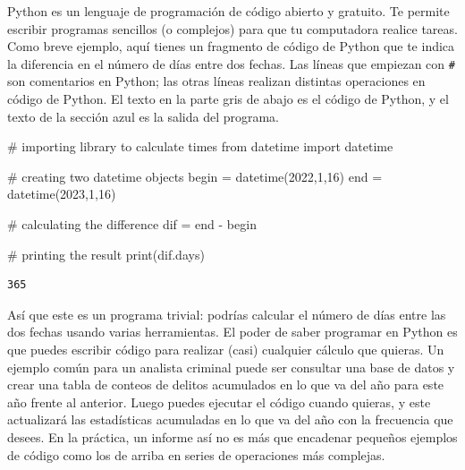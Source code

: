 \documentclass[
  letterpaper,
]{scrbook}
\newenvironment{Shaded}{\begin{snugshade}}{\end{snugshade}}
\newcommand{\BuiltInTok}[1]{\textcolor[rgb]{0.00,0.23,0.31}{#1}}
\newcommand{\CommentTok}[1]{\textcolor[rgb]{0.37,0.37,0.37}{#1}}
\newcommand{\DecValTok}[1]{\textcolor[rgb]{0.68,0.00,0.00}{#1}}
\newcommand{\ImportTok}[1]{\textcolor[rgb]{0.00,0.46,0.62}{#1}}
\newcommand{\NormalTok}[1]{\textcolor[rgb]{0.00,0.23,0.31}{#1}}
\newcommand{\OperatorTok}[1]{\textcolor[rgb]{0.37,0.37,0.37}{#1}}
\begin{document}

Python es un lenguaje de programación de código abierto y gratuito. Te
permite escribir programas sencillos (o complejos) para que tu
computadora realice tareas. Como breve ejemplo, aquí tienes un fragmento
de código de Python que te indica la diferencia en el número de días
entre dos fechas. Las líneas que empiezan con \texttt{\#} son
comentarios en Python; las otras líneas realizan distintas operaciones
en código de Python. El texto en la parte gris de abajo es el código de
Python, y el texto de la sección azul es la salida del programa.

\begin{Shaded}
\begin{Highlighting}[]
\CommentTok{\# importing library to calculate times}
\ImportTok{from}\NormalTok{ datetime }\ImportTok{import}\NormalTok{ datetime}

\CommentTok{\# creating two datetime objects}
\NormalTok{begin }\OperatorTok{=}\NormalTok{ datetime(}\DecValTok{2022}\NormalTok{,}\DecValTok{1}\NormalTok{,}\DecValTok{16}\NormalTok{)}
\NormalTok{end }\OperatorTok{=}\NormalTok{ datetime(}\DecValTok{2023}\NormalTok{,}\DecValTok{1}\NormalTok{,}\DecValTok{16}\NormalTok{)}

\CommentTok{\# calculating the difference}
\NormalTok{dif }\OperatorTok{=}\NormalTok{ end }\OperatorTok{{-}}\NormalTok{ begin}

\CommentTok{\# printing the result}
\BuiltInTok{print}\NormalTok{(dif.days)}
\end{Highlighting}
\end{Shaded}

\begin{verbatim}
365
\end{verbatim}

Así que este es un programa trivial: podrías calcular el número de días
entre las dos fechas usando varias herramientas. El poder de saber
programar en Python es que puedes escribir código para realizar (casi)
cualquier cálculo que quieras. Un ejemplo común para un analista
criminal puede ser consultar una base de datos y crear una tabla de
conteos de delitos acumulados en lo que va del año para este año frente
al anterior. Luego puedes ejecutar el código cuando quieras, y este
actualizará las estadísticas acumuladas en lo que va del año con la
frecuencia que desees. En la práctica, un informe así no es más que
encadenar pequeños ejemplos de código como los de arriba en series de
operaciones más complejas.
\end{document}
